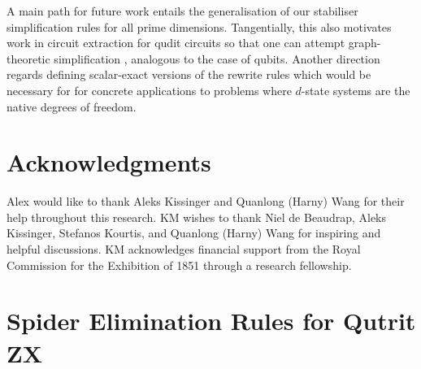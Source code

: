 \documentclass[submission,copyright,creativecommons]{eptcs}
\begin{document}
A main path for future work entails the generalisation
of our stabiliser simplification rules for all prime dimensions.
Tangentially, this also motivates work in circuit extraction \cite{backens2020again} for qudit circuits so that one can attempt graph-theoretic simplification \cite{graph_theoretic_simplification}, analogous to the case of qubits.
Another direction regards defining scalar-exact versions of the rewrite rules which would be necessary for
for concrete applications to problems where $d$-state systems are the native degrees of freedom.


\section{Acknowledgments}
Alex would like to thank Aleks Kissinger and Quanlong (Harny) Wang for their help throughout this research.
KM wishes to thank Niel de Beaudrap, Aleks Kissinger, Stefanos 
Kourtis, and Quanlong (Harny) Wang for inspiring and helpful discussions.
KM acknowledges financial support from the Royal Commission for the Exhibition of 1851 through a research fellowship.




\appendix



\section{Spider Elimination Rules for Qutrit ZX}




\end{document}
